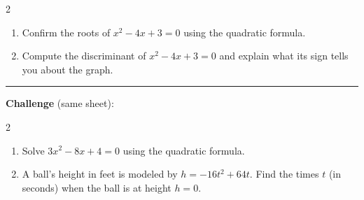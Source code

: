 \documentclass[12pt]{article}
\begin{document}
\begin{multicols}{2}
\begin{enumerate}[label=\textbf{\arabic*.}, start=10, itemsep=2cm]
  \item Confirm the roots of $x^2-4x+3=0$ using the quadratic formula.
  \item Compute the discriminant of $x^2-4x+3=0$ and explain what its sign tells you about the graph.
\end{enumerate}
\end{multicols}

\vspace{0.2cm}\hrule\vspace{0.3cm}
\textbf{Challenge} (same sheet):\\[4pt]
\begin{multicols}{2}
\begin{enumerate}[label=\textbf{\arabic*.}, start=12, itemsep=2.2cm]
  \item Solve $3x^2-8x+4=0$ using the quadratic formula.
  \item A ball's height in feet is modeled by $h=-16t^2+64t$. Find the times $t$ (in seconds) when the ball is at height $h=0$.
\end{enumerate}
\end{multicols}

\newpage
\end{document}
